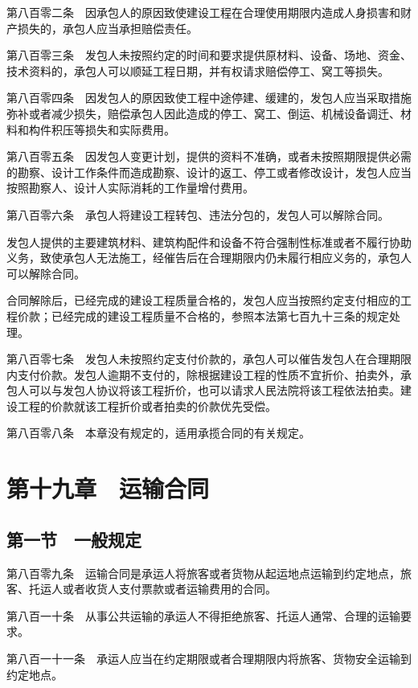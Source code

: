 \documentclass[UTF8,12pt,a4paper]{ctexbook}
\begin{document}
第八百零二条　因承包人的原因致使建设工程在合理使用期限内造成人身损害和财产损失的，承包人应当承担赔偿责任。

第八百零三条　发包人未按照约定的时间和要求提供原材料、设备、场地、资金、技术资料的，承包人可以顺延工程日期，并有权请求赔偿停工、窝工等损失。

第八百零四条　因发包人的原因致使工程中途停建、缓建的，发包人应当采取措施弥补或者减少损失，赔偿承包人因此造成的停工、窝工、倒运、机械设备调迁、材料和构件积压等损失和实际费用。

第八百零五条　因发包人变更计划，提供的资料不准确，或者未按照期限提供必需的勘察、设计工作条件而造成勘察、设计的返工、停工或者修改设计，发包人应当按照勘察人、设计人实际消耗的工作量增付费用。

第八百零六条　承包人将建设工程转包、违法分包的，发包人可以解除合同。

发包人提供的主要建筑材料、建筑构配件和设备不符合强制性标准或者不履行协助义务，致使承包人无法施工，经催告后在合理期限内仍未履行相应义务的，承包人可以解除合同。

合同解除后，已经完成的建设工程质量合格的，发包人应当按照约定支付相应的工程价款；已经完成的建设工程质量不合格的，参照本法第七百九十三条的规定处理。

第八百零七条　发包人未按照约定支付价款的，承包人可以催告发包人在合理期限内支付价款。发包人逾期不支付的，除根据建设工程的性质不宜折价、拍卖外，承包人可以与发包人协议将该工程折价，也可以请求人民法院将该工程依法拍卖。建设工程的价款就该工程折价或者拍卖的价款优先受偿。

第八百零八条　本章没有规定的，适用承揽合同的有关规定。

\section*{第十九章　运输合同}

\subsection*{第一节　一般规定}

第八百零九条　运输合同是承运人将旅客或者货物从起运地点运输到约定地点，旅客、托运人或者收货人支付票款或者运输费用的合同。

第八百一十条　从事公共运输的承运人不得拒绝旅客、托运人通常、合理的运输要求。

第八百一十一条　承运人应当在约定期限或者合理期限内将旅客、货物安全运输到约定地点。
\end{document}

